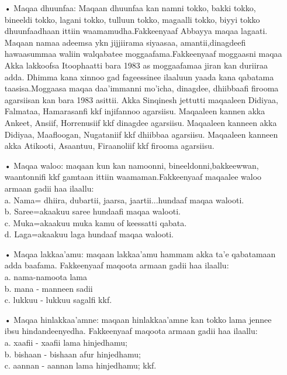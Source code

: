 \documentclass[11pt,b5paper]{book}
\begin{document}
\begin{itemize}
\item[•] Maqaa dhuunfaa: Maqaan dhuunfaa kan namni tokko, bakki tokko, bineeldi tokko, lagani tokko, tulluun tokko, magaalli tokko, biyyi tokko dhuunfaadhaan ittiin waamamudha.Fakkeenyaaf Abbayya maqaa lagaati. Maqaan namaa adeemsa ykn jijjiirama siyaasaa, amantii,dinagdeefi hawaasummaa waliin walqabatee moggaafama.Fakkeenyaaf moggaasni maqaa Akka lakkoofsa Itoophaatti bara 1983 as moggaafamaa jiran kan duriiraa adda\cite{sinqinash2018}. Dhimma kana xinnoo gad fageessinee ilaaluun yaada kana qabatama taasisa.Moggaasa maqaa daa’immanni mo’icha, dinagdee, dhiibbaafi firooma agarsiisan kan bara 1983 asittii\cite{sinqinash2018}. Akka Sinqinesh jettutti maqaaleen Didiyaa, Falmataa, Hamarasanfi kkf injifannoo agarsiisu. Maqaaleen kannen akka Ankeet, Ansiif, Horrenusiif kkf dinagdee agarsiisu. Maqaaleen kanneen akka Didiyaa, Maafloogan, Nugataniif kkf dhiibbaa agarsiisu. Maqaaleen kanneen akka Atikooti, Asaantuu, Firaanoliif kkf firooma agarsiisu.

\item[•] Maqaa waloo: maqaan kun kan namoonni, bineeldonni,bakkeewwan, waantonnifi kkf gamtaan ittiin waamaman.Fakkeenyaaf maqaalee waloo armaan gadii haa ilaallu:\\
a. Nama= dhiira, dubartii, jaarsa, jaartii...hundaaf maqaa walooti.\\
b. Saree=akaakuu saree hundaafi maqaa walooti.\\
c. Muka=akaakuu muka kamu of keessatti qabata.\\
d. Laga=akaakuu laga hundaaf maqaa walooti.

\item[•] Maqaa lakkaa’amu: maqaan lakkaa'amu hammam akka ta'e qabatamaan adda baafama. Fakkeenyaaf maqoota armaan gadii haa ilaallu:\\
a. nama-namoota lama\\
b. mana - manneen sadii\\
c. lukkuu - lukkuu sagalfi kkf.

\item[•] Maqaa hinlakkaa’amne: maqaan hinlakkaa'amne kan tokko lama jennee ibsu hindandeenyedha. Fakkeenyaaf maqoota armaan gadii haa ilaallu:\\
a. xaafii - xaafii lama hinjedhamu;\\
b. bishaan - bishaan afur hinjedhamu;\\
c. aannan - aannan lama hinjedhamu; kkf.
\end{itemize}
\end{document}
